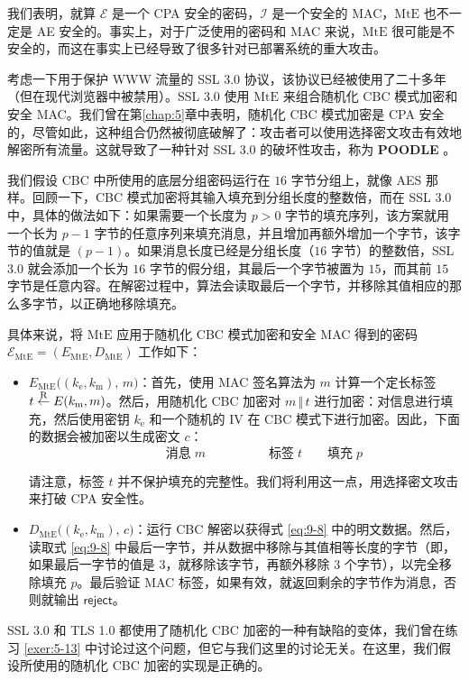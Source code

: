 \begin{snote}
我们表明，就算 $\mathcal{E}$ 是一个 CPA 安全的密码，$\mathcal{I}$ 是一个安全的 MAC，$\mathrm{MtE}$ 也不一定是 AE 安全的。事实上，对于广泛使用的密码和 MAC 来说，$\mathrm{MtE}$ 很可能是不安全的，而这在事实上已经导致了很多针对已部署系统的重大攻击。

考虑一下用于保护 WWW 流量的 SSL 3.0 协议，该协议已经被使用了二十多年（但在现代浏览器中被禁用）。SSL 3.0 使用 $\mathrm{MtE}$ 来组合随机化 CBC 模式加密和安全 MAC。我们曾在第\ref{chap:5}章中表明，随机化 CBC 模式加密是 CPA 安全的，尽管如此，这种组合仍然被彻底破解了：攻击者可以使用选择密文攻击有效地解密所有流量。这就导致了一种针对 SSL 3.0 的破坏性攻击，称为 \textbf{POODLE} \cite{moller2014poodle}。

我们假设 CBC 中所使用的底层分组密码运行在 $16$ 字节分组上，就像 AES 那样。回顾一下，CBC 模式加密将其输入填充到分组长度的整数倍，而在 SSL 3.0 中，具体的做法如下：如果需要一个长度为 $p>0$ 字节的填充序列，该方案就用一个长为 $p-1$ 字节的任意序列来填充消息，并且增加再额外增加一个字节，该字节的值就是 $(p-1)$。如果消息长度已经是分组长度（$16$ 字节）的整数倍，SSL 3.0 就会添加一个长为 $16$ 字节的假分组，其最后一个字节被置为 $15$，而其前 $15$ 字节是任意内容。在解密过程中，算法会读取最后一个字节，并移除其值相应的那么多字节，以正确地移除填充。

具体来说，将 $\mathrm{MtE}$ 应用于随机化 CBC 模式加密和安全 MAC 得到的密码 $\mathcal{E}_\mathrm{MtE}=(E_\mathrm{MtE},D_\mathrm{MtE})$ 工作如下：
\begin{itemize}
	\item $E_\mathrm{MtE}\big((k_\mathrm{e},k_\mathrm{m}),\,m\big)$：首先，使用 MAC 签名算法为 $m$ 计算一个定长标签 $t\overset{\rm R}\leftarrow E(k_\mathrm{m},m)$。然后，用随机化 CBC 加密对 $m\,\Vert\,t$ 进行加密：对信息进行填充，然后使用密钥 $k_\mathrm{e}$ 和一个随机的 IV 在 CBC 模式下进行加密。因此，下面的数据会被加密以生成密文 $c$：
	\begin{equation}\label{eq:9-8}
		\boxed{\qquad\qquad\text{消息}\; m \qquad\qquad}\boxed{\quad\text{标签}\; t \quad}\boxed{\quad\text{填充}\; p \quad}
	\end{equation}
	
	请注意，标签 $t$ 并不保护填充的完整性。我们将利用这一点，用选择密文攻击来打破 CPA 安全性。
	\item $D_\mathrm{MtE}\big((k_\mathrm{e},k_\mathrm{m}),\,c\big)$：运行 CBC 解密以获得式 \ref{eq:9-8} 中的明文数据。然后，读取式 \ref{eq:9-8} 中最后一字节，并从数据中移除与其值相等长度的字节（即，如果最后一字节的值是 $3$，就移除该字节，再额外移除 $3$ 个字节），以完全移除填充 $p$。最后验证 MAC 标签，如果有效，就返回剩余的字节作为消息，否则就输出 $\mathsf{reject}$。
\end{itemize}
SSL 3.0 和 TLS 1.0 都使用了随机化 CBC 加密的一种有缺陷的变体，我们曾在练习 \ref{exer:5-13} 中讨论过这个问题，但它与我们这里的讨论无关。在这里，我们假设所使用的随机化 CBC 加密的实现是正确的。
\end{snote}

